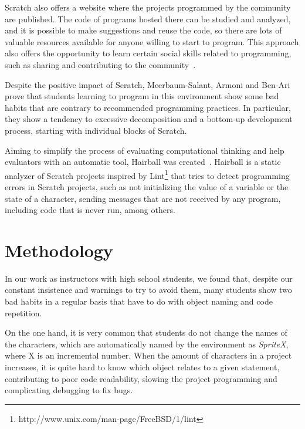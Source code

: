 \documentclass[conference]{format/IEEEtran}
\begin{document}
Scratch also offers a website where the projects programmed by the community are published. The code of programs hosted there can be studied and analyzed, and it is possible to make suggestions and reuse the code, so there are lots of valuable resources available for anyone willing to start to program. This approach also offers the opportunity to learn certain social skills related to programming, such as sharing and contributing to the community~\cite{scaffidi2012skill}.


Despite the positive impact of Scratch, Meerbaum-Salant, Armoni and Ben-Ari~\cite{meerbaum2011habits} prove that students learning to program in this environment show some bad habits that are contrary to recommended programming practices. In particular, they show a tendency to excessive decomposition and a bottom-up development process, starting with individual blocks of Scratch.

Aiming to simplify the process of evaluating computational thinking and help evaluators with an automatic tool, Hairball was created~\cite{boe2013hairball}. Hairball is a static analyzer of Scratch projects inspired by Lint\footnote{http://www.unix.com/man-page/FreeBSD/1/lint} that tries to detect programming errors in Scratch projects, such as not initializing the value of a variable or the state of a character, sending messages that are not received by any program, including code that is never run, among others.

\section{Methodology}
\label{sec:methodology}

In our work as instructors with high school students, we found that, despite our constant insistence and warnings to try to avoid them, many students show two bad habits in a regular basis that have to do with object naming and code repetition.
    
On the one hand, it is very common that students do not change the names of the characters, which are automatically named by the environment as \textit{SpriteX}, where X is an incremental number. When the amount of characters in a project increases, it is quite hard to know which object relates to a given statement, contributing to poor code readability, slowing the project programming and complicating debugging to fix bugs.
\end{document}
